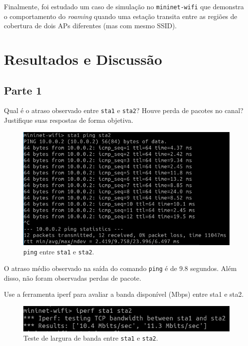 \documentclass{article}
\begin{document}
Finalmente, foi estudado um caso de simulação no \texttt{mininet-wifi}
que demonstra o comportamento do \textit{roaming} quando uma
estação transita entre as regiões de cobertura de dois APs
diferentes (mas com mesmo SSID).


\section{Resultados e Discussão}

\subsection*{Parte 1}

\begin{tcolorbox}
    Qual é o atraso observado entre \texttt{sta1} e \texttt{sta2}?
    Houve perda de pacotes no canal? Justifique suas respostas de forma objetiva.
\end{tcolorbox}

\begin{figure}[!htb]
\centering
\includegraphics[width=\columnwidth]{images/p1_ping.png}
\caption{\texttt{ping} entre \texttt{sta1} e \texttt{sta2}.}
\end{figure}

O atraso médio observado na saída do comando \texttt{ping} é de 9.8 segundos.
Além disso, não foram observadas perdas de pacote.

\begin{tcolorbox}
    Use a ferramenta iperf para avaliar a banda disponível (Mbps)
    entre sta1 e sta2.
\end{tcolorbox}

\begin{figure}[!htb]
\centering
\includegraphics[width=\columnwidth]{images/p1_iperf.png}
\caption{Teste de largura de banda entre \texttt{sta1} e \texttt{sta2}.}
\end{figure}
\end{document}
